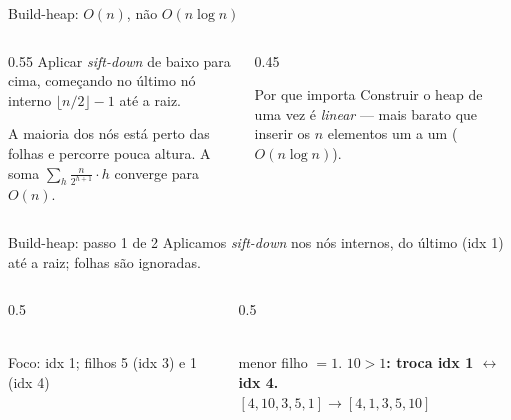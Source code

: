 \documentclass[aspectratio=169]{beamer}
\begin{document}
\begin{frame}{Build-heap: $O(n)$, não $O(n\log n)$}
  \begin{columns}[T]
    \begin{column}{0.55\textwidth}
      Aplicar \emph{sift-down} de baixo para cima, começando no último nó
      interno $\lfloor n/2\rfloor - 1$ até a raiz.

      \medskip
      A maioria dos nós está perto das folhas e percorre pouca altura. A soma
      $\sum_h \frac{n}{2^{h+1}} \cdot h$ converge para $O(n)$.
    \end{column}
    \begin{column}{0.45\textwidth}
      \begin{exampleblock}{Por que importa}
        Construir o heap de uma vez é \emph{linear} — mais barato que inserir os
        $n$ elementos um a um ($O(n\log n)$).
      \end{exampleblock}
    \end{column}
  \end{columns}
\end{frame}

\begin{frame}{Build-heap: passo 1 de 2}
  Aplicamos \emph{sift-down} nos nós internos, do último (idx 1) até a raiz;
  folhas são ignoradas.
  \begin{columns}[T]
    \begin{column}{0.5\textwidth}
    \centering
    \\[0.3em]
    {\footnotesize Foco: idx 1; filhos 5 (idx 3) e 1 (idx 4)}
    \end{column}
    \begin{column}{0.5\textwidth}
    \centering
    \\[0.6em]
    {\footnotesize menor filho $=1$. \textbf{$10>1$: troca idx 1 $\leftrightarrow$ idx 4.}\\
    $[4,10,3,5,1]\to[4,1,3,5,10]$}
    \end{column}
  \end{columns}
\end{frame}
\end{document}
